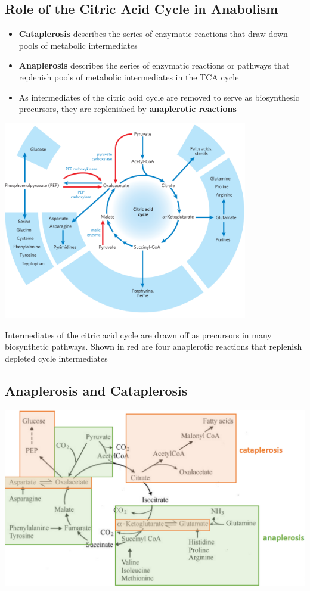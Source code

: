 \documentclass[10pt]{article}
\begin{document}
\subsection*{Role of the Citric Acid Cycle in Anabolism}
\begin{itemize}
	\item \textbf{Cataplerosis} describes the series of enzymatic reactions that draw down pools of metabolic intermediates
	\item \textbf{Anaplerosis} describes the series of enzymatic reactions or pathways that replenish pools of metabolic intermediates in the TCA cycle
	\item As intermediates of the citric acid cycle are removed to serve as biosynthesic precursors, they are replenished by \textbf{anaplerotic reactions}
\end{itemize}
\begin{center} 
    \includegraphics*[width=0.8\textwidth]{L4_23.png} 
\end{center}
Intermediates of the citric acid cycle are drawn off as precursors in many biosynthetic pathways.  Shown in red are four anaplerotic reactions that replenish depleted cycle intermediates

\subsection*{Anaplerosis and Cataplerosis}
\begin{center} 
    \includegraphics*[width=\textwidth]{L4_24.png} 
\end{center}
\end{document}
